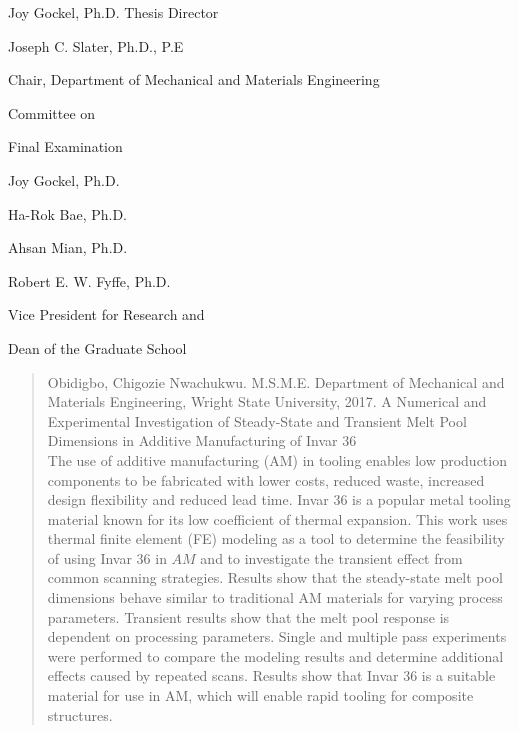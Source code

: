 \documentclass[10pt]{article}
\begin{document}
Joy Gockel, Ph.D. Thesis Director

Joseph C. Slater, Ph.D., P.E

Chair, Department of Mechanical and Materials Engineering

Committee on

Final Examination

Joy Gockel, Ph.D.

Ha-Rok Bae, Ph.D.

Ahsan Mian, Ph.D.

Robert E. W. Fyffe, Ph.D.

Vice President for Research and

Dean of the Graduate School

\begin{abstract}
Obidigbo, Chigozie Nwachukwu. M.S.M.E. Department of Mechanical and Materials Engineering, Wright State University, 2017. A Numerical and Experimental Investigation of Steady-State and Transient Melt Pool Dimensions in Additive Manufacturing of Invar 36\\
The use of additive manufacturing (AM) in tooling enables low production components to be fabricated with lower costs, reduced waste, increased design flexibility and reduced lead time. Invar 36 is a popular metal tooling material known for its low coefficient of thermal expansion. This work uses thermal finite element (FE) modeling as a tool to determine the feasibility of using Invar 36 in $A M$ and to investigate the transient effect from common scanning strategies. Results show that the steady-state melt pool dimensions behave similar to traditional AM materials for varying process parameters. Transient results show that the melt pool response is dependent on processing parameters. Single and multiple pass experiments were performed to compare the modeling results and determine additional effects caused by repeated scans. Results show that Invar 36 is a suitable material for use in AM, which will enable rapid tooling for composite structures.
\end{abstract}
\end{document}
